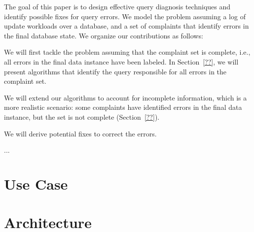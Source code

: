 The goal of this paper is to design effective query
diagnosis techniques and identify possible fixes for query errors. We
model the problem assuming a log of update workloads over a database,
and a set of complaints that identify errors in the final database
state. We organize our contributions as follows:

\begin{description}[leftmargin=5mm, topsep=0mm, itemsep=0mm]        
    \item[Diagnosis with complete information:] We will first tackle the
    problem assuming that the complaint set is complete, i.e., all errors in
    the final data instance have been labeled. In Section~\ref{??}, we will
    present algorithms that identify the query responsible for all errors in
    the complaint set.
    
    \item[Diagnosis with incomplete information:] We will extend our
    algorithms to account for incomplete information, which is a more
    realistic scenario: some complaints have identified errors in the
    final data instance, but the set is not complete (Section~\ref{??}).
    
    \item[Deriving fixes:] We will derive potential fixes to correct
    the errors.
    
    \item[Evaluation:]...
\end{description}



\section{Use Case}

\section{Architecture}









